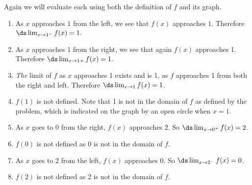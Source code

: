 \begin{solution}
{Again we will evaluate each using both the definition of $f$ and its graph.
		\begin{enumerate}
		\item		As $x$ approaches $ 1 $ from the left, we see that $f(x)$ approaches $ 1 $. Therefore $\ds \lim_{x\to 1^-} f(x)=1.$
		\item		As $x$ approaches 1 from the right, we see that again $f(x)$ approaches 1. Therefore $\ds \lim_{x\to 1+} f(x)=1$.
		\item		\textit{The} limit of $f$ as $x$ approaches 1 exists and is 1, as $f$ approaches 1 from both the right and left. Therefore $\ds \lim_{x\to 1} f(x)=1$.
		\item		$f(1)$ is not defined. Note that 1 is not in the domain of $f$ as defined by the problem, which is indicated on the graph by an open circle when $x=1$.
		\item		As $x$ goes to 0 from the right, $f(x)$ approaches 2. So $\ds \lim_{x\to 0^+} f(x)=2$.
		\item		$f(0)$  is not defined as $0$ is not in the domain of $f$.
		\item		As $x$ goes to 2 from the left, $f(x)$ approaches 0. So $\ds \lim_{x\to 2^-} f(x)=0$.
		\item		$f(2)$  is not defined as 2 is not in the domain of $f$.
		\end{enumerate}
}
\end{solution}






